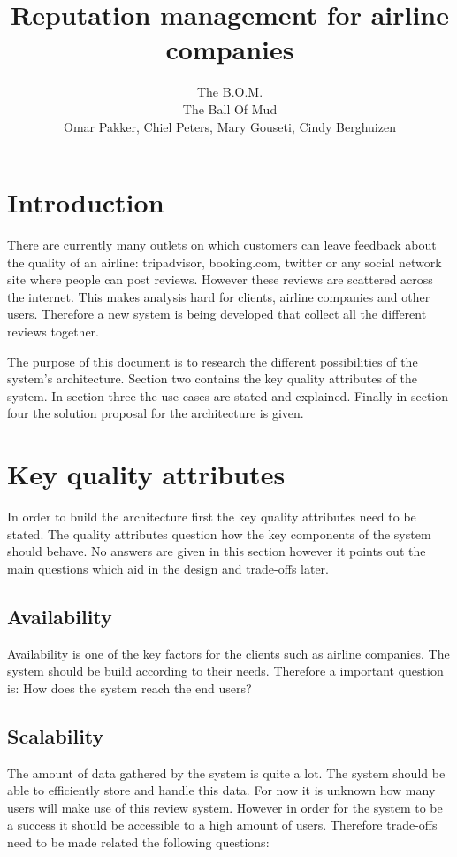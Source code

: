 \documentclass{article}
\author{ The B.O.M. \\
\small{The Ball Of Mud}\\
\small{Omar Pakker, Chiel Peters, Mary Gouseti, Cindy Berghuizen}}
\title{Reputation management for airline companies}
\begin{document}
\maketitle

\section*{Introduction}

There are currently many outlets on which customers can leave feedback about the quality of an airline: tripadvisor, booking.com, twitter or any social network site where people can post reviews. However these reviews are scattered across the internet. This makes analysis hard for clients, airline companies and other users. Therefore a new system is being developed that collect all the different reviews together.

The purpose of this document is to research the different possibilities of the system's architecture. Section two contains the key quality attributes of the system. In section three the use cases are stated and explained. Finally in section four the solution proposal for the architecture is given.

\section*{Key quality attributes}

In order to build the architecture first the key quality attributes need to be stated. The quality attributes question how the key components of the system should behave. No answers are given in this section however it points out the main questions which aid in the design and trade-offs later.

\subsection*{Availability}
Availability is one of the key factors for the clients such as airline companies. The system should be build according to their needs. Therefore a important question is: How does the system reach the end users?

\subsection*{Scalability}
The amount of data gathered by the system is quite a lot. The system should be able to efficiently store and handle this data. 
For now it is unknown how many users will make use of this review system. However in order for the system to be a success it should be accessible to a high amount of users. Therefore trade-offs need to be made related the following questions:
\end{document}
